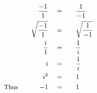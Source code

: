 \begin{alignat*}{5}
&\,&\frac{-1}{1}\quad&=\quad&&\frac{1}{-1}\\
&\,&\sqrt{\frac{-1}{1}}\quad&=&&\sqrt{\frac{1}{-1}}\\
&\,&\frac{i}{1}\quad&=&&\frac{1}{i}\\
&\,&i\quad&=&&\frac{1}{i}\\
&\,&i^2\quad&=&&1\\
&\small\text{Thus}\quad&-1\quad&=&&1
\end{alignat*}
